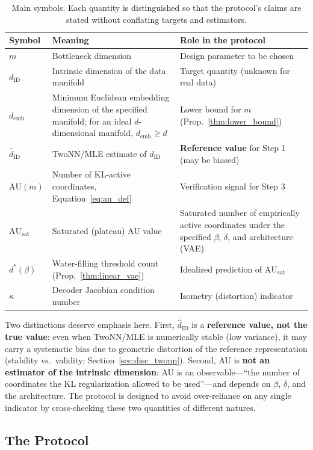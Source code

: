 \documentclass[make,article,submit,pdftex,moreauthors]{Definitions/mdpi}
\newcommand{\dID}{d_{\mathrm{ID}}}
\newcommand{\hatdID}{\hat{d}_{\mathrm{ID}}}
\newcommand{\kap}{\kappa}
\newcommand{\AUsat}{\mathrm{AU}_{\mathrm{sat}}}
\newcommand{\demb}{d_{\mathrm{emb}}}
\newcommand{\dstar}{d^{*}(\beta)}
\begin{document}
\begin{table}[H]
\caption{Main symbols. Each quantity is distinguished so that the protocol's
claims are stated without conflating targets and estimators.}
\label{tab:notation}
\small
\begin{tabular}{lp{5.6cm}p{4.9cm}}
\toprule
\textbf{Symbol} & \textbf{Meaning} & \textbf{Role in the protocol} \\
\midrule
$m$ & Bottleneck dimension & Design parameter to be chosen \\
$\dID$ & Intrinsic dimension of the data manifold & Target quantity (unknown for real data) \\
$\demb$ & Minimum Euclidean embedding dimension of the specified manifold; for an ideal $d$-dimensional manifold, $\demb \geq d$ & Lower bound for $m$ (Prop.~\ref{thm:lower_bound}) \\
$\hatdID$ & TwoNN/MLE estimate of $\dID$ & \textbf{Reference value} for Step 1 (may be biased) \\
$\mathrm{AU}(m)$ & Number of KL-active coordinates, Equation~\eqref{eq:au_def} & Verification signal for Step 3 \\
$\AUsat$ & Saturated (plateau) AU value & Saturated number of empirically active coordinates under the specified $\beta$, $\delta$, and architecture (VAE) \\
$\dstar$ & Water-filling threshold count (Prop.~\ref{thm:linear_vae}) & Idealized prediction of $\AUsat$ \\
$\kap$ & Decoder Jacobian condition number & Isometry (distortion) indicator \\
\bottomrule
\end{tabular}
\end{table}

Two distinctions deserve emphasis here.
First, $\hatdID$ is a \textbf{reference value, not the true value}: even
when TwoNN/MLE is numerically stable (low variance), it may carry a
systematic bias due to geometric distortion of the reference representation
(stability vs.\ validity; Section~\ref{sec:disc_twonn}).
Second, AU is \textbf{not an estimator of the intrinsic dimension}: AU is an
observable---``the number of coordinates the KL regularization allowed to be
used''---and depends on $\beta$, $\delta$, and the architecture.
The protocol is designed to avoid over-reliance on any single indicator by
cross-checking these two quantities of different natures.

\subsection{The Protocol}\label{sec:protocol_main}
\end{document}
